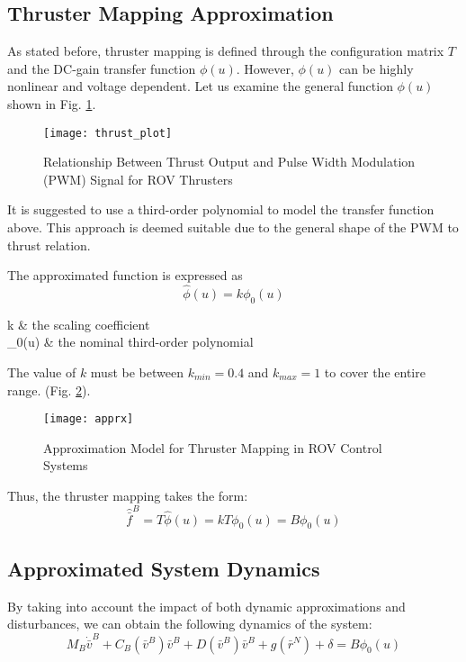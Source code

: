 \subsection{Thruster Mapping Approximation}
    As stated before, thruster mapping is defined through the configuration 
    matrix $T$ and the DC-gain transfer function $\phi(u)$. However, $\phi(u)$ 
    can be highly nonlinear and voltage dependent. 
    Let us examine the general function $\phi(u)$ shown in Fig. \ref{image:thrust}.
    \begin{figure}[H]
        \centering\texttt{[image: thrust\_plot]}
        \caption{Relationship Between Thrust Output and Pulse Width Modulation (PWM) Signal for ROV Thrusters}
        \label{image:thrust}
    \end{figure}
    It is suggested to use a third-order polynomial to model the transfer function above. 
    This approach is deemed suitable due to the general shape of the PWM to thrust relation.
    
    The approximated function is expressed as 
    \begin{equation}
        \hat{\phi}(u) = k\phi_0(u)   
    \end{equation}
    \begin{conditions}
        \text{\quad}k & the scaling coefficient\\
        \phi_0(u) & the nominal third-order polynomial
    \end{conditions} 
    \vspace{0.5cm}

    The value of $k$ must be between $k_{min} = 0.4$ and $k_{max} = 1$ to cover the 
    entire range.
    (Fig. \ref{image:thrust_apprx}).
    \begin{figure}[H]
        \centering\texttt{[image: apprx]}
        \caption{Approximation Model for Thruster Mapping in ROV Control Systems}
        \label{image:thrust_apprx}
    \end{figure}
    
    Thus, the thruster mapping takes the form:
    \begin{equation}
        \hat{\bar{f}}^B=T\hat{\phi}(u) = kT\phi_0(u) = B\phi_0(u)
    \end{equation}

    \subsection{Approximated System Dynamics}
    By taking into account the impact of both dynamic approximations 
    and disturbances, we can obtain the following dynamics of the 
    system:
    \begin{equation}
        M_B \dot{\bar{v}}^B + C_B(\bar{v}^B) \bar{v}^B+D(\bar{v}^B) \bar{v}^B+g(\bar{r}^N)
         + \delta = B\phi_0(u)
    \end{equation}
    
